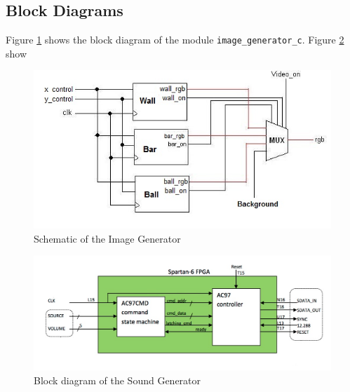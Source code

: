 	
	\subsection{Block Diagrams}
		Figure \ref{img_gen} shows the block diagram of the module \texttt{image\_generator\_c}. Figure \ref{snd_gen} show
		
	\begin{figure}[here]
		\centering
		\includegraphics[scale=0.7]{images/img_gen.jpg}
		\caption{Schematic of the Image Generator}
		\label{img_gen}
	\end{figure}
	
	\begin{figure}[here]
		\centering
		\includegraphics[scale=0.5]{images/snd_gen.jpg}
		\caption{Block diagram of the Sound Generator}
		\label{snd_gen}
	\end{figure}
	
	
	
		
		
